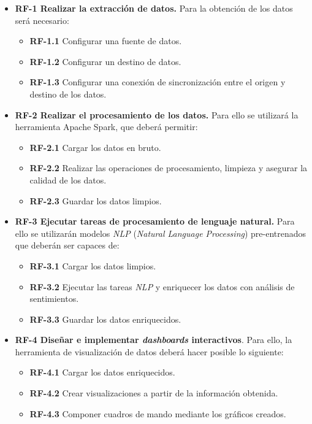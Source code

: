 \begin{itemize}

    \item \textbf{RF-1 Realizar la extracción de datos.} Para la obtención de los datos será necesario:
    \begin{itemize}
        \item \textbf{RF-1.1} Configurar una fuente de datos.
        \item \textbf{RF-1.2} Configurar un destino de datos.
        \item \textbf{RF-1.3} Configurar una conexión de sincronización entre el origen y destino de los datos.
    \end{itemize}

    \item \textbf{RF-2 Realizar el procesamiento de los datos.} Para ello se utilizará la herramienta Apache Spark, que deberá permitir:
    \begin{itemize}
        \item \textbf{RF-2.1} Cargar los datos en bruto.
        \item \textbf{RF-2.2} Realizar las operaciones de procesamiento, limpieza y asegurar la calidad de los datos.
        \item \textbf{RF-2.3} Guardar los datos limpios.
    \end{itemize}

    \item \textbf{RF-3 Ejecutar tareas de procesamiento de lenguaje natural.} Para ello se utilizarán modelos \textit{NLP} (\textit{Natural Language Processing}) pre-entrenados que deberán ser capaces de:
    \begin{itemize}
        \item \textbf{RF-3.1} Cargar los datos limpios.
        \item \textbf{RF-3.2} Ejecutar las tareas \textit{NLP} y enriquecer los datos con análisis de sentimientos.
        \item \textbf{RF-3.3} Guardar los datos enriquecidos.
    \end{itemize}

    \item \textbf{RF-4 Diseñar e implementar \textit{dashboards} interactivos}. Para ello, la herramienta de visualización de datos deberá hacer posible lo siguiente:
    \begin{itemize}
        \item \textbf{RF-4.1} Cargar los datos enriquecidos.
        \item \textbf{RF-4.2} Crear visualizaciones a partir de la información obtenida.
        \item \textbf{RF-4.3} Componer cuadros de mando mediante los gráficos creados.
    \end{itemize}

\end{itemize}

